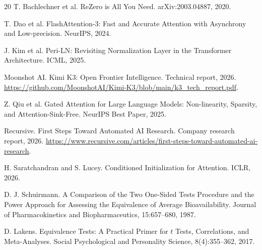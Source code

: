 \documentclass{article}
\begin{document}
\clearpage
{\footnotesize
\begin{thebibliography}{20}
T. Bachlechner et al. ReZero is All You Need. arXiv:2003.04887, 2020.

T. Dao et al. FlashAttention-3: Fast and Accurate Attention with
Asynchrony and Low-precision. NeurIPS, 2024.

J. Kim et al. Peri-LN: Revisiting Normalization Layer in the Transformer
Architecture. ICML, 2025.

Moonshot AI. Kimi K3: Open Frontier Intelligence. Technical report, 2026.
\url{https://github.com/MoonshotAI/Kimi-K3/blob/main/k3_tech_report.pdf}.

Z. Qiu et al. Gated Attention for Large Language Models: Non-linearity,
Sparsity, and Attention-Sink-Free. NeurIPS Best Paper, 2025.

Recursive. First Steps Toward Automated AI Research. Company research
report, 2026.
\url{https://www.recursive.com/articles/first-steps-toward-automated-ai-research}.

H. Saratchandran and S. Lucey. Conditioned Initialization for Attention.
ICLR, 2026.

D. J. Schuirmann. A Comparison of the Two One-Sided Tests Procedure and
the Power Approach for Assessing the Equivalence of Average Bioavailability.
Journal of Pharmacokinetics and Biopharmaceutics, 15:657--680, 1987.

D. Lakens. Equivalence Tests: A Practical Primer for $t$ Tests,
Correlations, and Meta-Analyses. Social Psychological and Personality
Science, 8(4):355--362, 2017.
\end{thebibliography}
}
\end{document}
